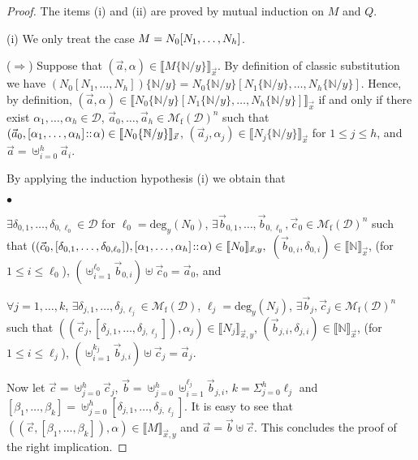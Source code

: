 \documentclass{LMCS}
\newcommand{\subst}[2]{\{ #2 / #1 \}}	\newcommand{\dg}[2]{\mathrm{deg}_{#1}(#2)} \newcommand{\obsle}{\sqsubseteq_{\mathcal{O}}}
\newcommand{\Int}[1]{\llbracket #1\rrbracket} \newcommand{\trm}[1]{#1^{\textrm{--}}}
\newcommand{\Mfin}[1]{\mathcal{M}_{\mathrm{f}}(#1)}
\newcommand{\mcup}{\uplus}
\newcommand{\seq}[1]{\vec{#1}}
\newcommand{\sN}{\mathbb{N}}
\newcommand{\cD}{\mathcal{D}}
\begin{document}
\begin{proof}The items (i) and (ii) are proved by mutual induction on $M$ and $Q$.

(i) We only treat the case $M = N_0[N_1,\ldots,N_h]$.

($\Rightarrow$) Suppose that $(\seq a,\alpha)\in \Int{M\subst{y}{\sN}}_{\seq x}$. By definition of classic substitution we have 
$(N_0[N_1,\ldots,N_h])\subst{y}{\sN} = N_0\subst{y}{\sN}[N_1\subst{y}{\sN},\ldots,N_h\subst{y}{\sN}]$. 
Hence, by definition, $(\seq a,\alpha)\in \Int{N_0\subst{y}{\sN}[N_1\subst{y}{\sN},\ldots,N_h\subst{y}{\sN}]}_{\seq x}$ if and only if 
there exist $\alpha_1,\ldots,\alpha_h \in \cD$, $\seq a_0,\ldots,\seq a_h \in \Mfin{\cD}^n$ such that $(\seq a_0,[\alpha_1,\ldots,\alpha_h] \at \alpha)\in \Int{N_0\subst{y}{\sN}}_{\seq x}$, $(\seq a_j,\alpha_j) \in \Int{N_j\subst{y}{\sN}}_{\seq x}$ for $1\le j\le h$, and $\seq{a} = \mcup_{i=0}^h \seq a_i$. 

By applying the induction hypothesis (i) we obtain that 
\begin{iteMize}{$\bullet$}
\item $\exists\delta_{0,1},\ldots,\delta_{0,\ell_0}\in \cD$ for $\ell_0=\dg{y}{N_0}$,
	 $\exists \seq b_{0,1},\ldots,\seq b_{0,\ell_0},\seq c_{0} \in
  \Mfin{\cD}^n$ such that \newline
        $((\seq c_0,[\delta_{0,1},\ldots,\delta_{0,\ell_0}]),[\alpha_1,\ldots,\alpha_h] \at \alpha)  \in \Int{N_0}_{\seq x,y},$
        $(\seq b_{0,i},\delta_{0,i}) \in \Int{\sN}_{\seq x}$, (for $1\leq i \leq \ell_0$),
        $(\mcup_{i=1}^{\ell_0} \seq b_{0,i}) \mcup \seq c_0 = \seq a_0$, and
\item $\forall j=1,\ldots,k$, $\exists \delta_{j,1},\ldots,\delta_{j,\ell_j} \in \Mfin{\cD}$, $\ell_j=\dg{y}{N_j}$,
	 $\exists \seq b_j,\seq c_j \in \Mfin{\cD}^n$ such that
        $((\seq c_j,[\delta_{j,1},\ldots,\delta_{j,\ell_j}]),\alpha_j) \in \Int{N_j}_{\seq x,y}$,
        $(\seq b_{j,i},\delta_{j,i}) \in \Int{\sN}_{\seq x}$, (for $1\leq i \leq \ell_j$),
        $(\mcup_{i=1}^{k_j} \seq b_{j,i}) \mcup \seq c_j = \seq a_j$.
\end{iteMize}

\noindent Now let $\seq {c} = \mcup_{j=0}^{h}\seq c_j$, $\seq {b} = \mcup_{j=0}^{h} \mcup_{i=1}^{\ell_j} \seq b_{j,i}$, 
$k = \Sigma_{j=0}^{h} \ell_j$ and $[\beta_1,\ldots,\beta_k] = \mcup_{j=0}^{h} [\delta_{j,1},\ldots,\delta_{j,\ell_j}]$. 
It is easy to see that $((\seq {c},[\beta_1,\ldots,\beta_k]),\alpha)\in\Int{M}_{\seq x,y}$ and $\seq a = \seq {b} \mcup \seq {c}$. 
This concludes the proof of the right implication.


\end{proof}
\end{document}
